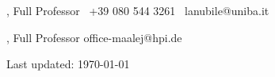 \documentclass[9pt]{article}
\begin{document}
\bigskip
\medskip

\noindent\begin{minipage}[t]{2.1in}
  , Full Professor
  \newline{}
  \newline\noindent \faPhone~+39 080 544 3261
  \newline\noindent \faEnvelope~lanubile@uniba.it
\end{minipage}
\hfill
\noindent\begin{minipage}[t]{2in}
  , Full Professor
  \newline{}
  \newline\noindent \faEnvelope office-maalej@hpi.de
\end{minipage}

\begin{center}
  {\scriptsize  Last updated: \today\ }
\end{center}
\end{document}
